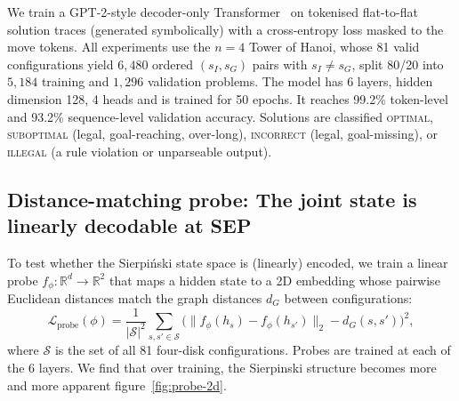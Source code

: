 \documentclass{article} %
\begin{document}

We train a GPT-2-style decoder-only Transformer~\citep{radford2019language} on tokenised flat-to-flat solution traces (generated symbolically) with a cross-entropy loss masked to the move tokens. %
All experiments use the $n=4$ Tower of Hanoi, whose 81 valid configurations %
yield $6{,}480$ ordered $(s_I,s_G)$ pairs with $s_I\neq s_G$, split 80/20 into $5{,}184$ training and $1{,}296$ validation problems. The model has 6 layers, hidden dimension 128, 4 heads and is trained for 50 epochs. It reaches 99.2\% token-level and 93.2\% sequence-level validation accuracy. 
Solutions are classified \textsc{optimal}, \textsc{suboptimal} (legal, goal-reaching, over-long), \textsc{incorrect} (legal, goal-missing), or \textsc{illegal} (a rule violation or unparseable output).

\subsection{Distance-matching probe: The joint state is linearly decodable at SEP}

To test whether the Sierpi\'nski state space is (linearly) encoded, we train a linear probe $f_\phi:\mathbb{R}^d\!\to\!\mathbb{R}^2$ that maps a hidden state to a 2D embedding whose pairwise Euclidean distances match the graph distances $d_G$ between configurations:
\begin{equation}\label{eq:distance-probe}
  \mathcal{L}_{\text{probe}}(\phi) = \frac{1}{|\mathcal{S}|^2} \sum_{s, s' \in \mathcal{S}} \bigl( \|f_\phi(h_s) - f_\phi(h_{s'})\|_2 - d_G(s, s') \bigr)^2,
\end{equation}
where $\mathcal{S}$ is the set of all 81 four-disk configurations. Probes are trained at each of the 6 layers. We find that over training, the Sierpinski structure becomes more and more apparent figure~\ref{fig:probe-2d}.
\end{document}
